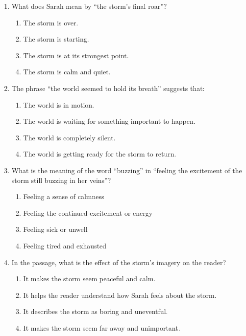 \documentclass[12pt]{article}
\begin{document}
\begin{enumerate}
\vspace{0.5cm}

\item What does Sarah mean by “the storm’s final roar”?

\begin{enumerate}[label=\Alph*.]
    \item The storm is over.
    \item The storm is starting.
    \item The storm is at its strongest point.
    \item The storm is calm and quiet.
\end{enumerate}

\vspace{0.5cm}

\item The phrase “the world seemed to hold its breath” suggests that:

\begin{enumerate}[label=\Alph*.]
    \item The world is in motion.
    \item The world is waiting for something important to happen.
    \item The world is completely silent.
    \item The world is getting ready for the storm to return.
\end{enumerate}

\vspace{0.5cm}

\item What is the meaning of the word “buzzing” in “feeling the excitement of the storm still buzzing in her veins”?

\begin{enumerate}[label=\Alph*.]
    \item Feeling a sense of calmness
    \item Feeling the continued excitement or energy
    \item Feeling sick or unwell
    \item Feeling tired and exhausted
\end{enumerate}

\vspace{0.5cm}

\item In the passage, what is the effect of the storm’s imagery on the reader?

\begin{enumerate}[label=\Alph*.]
    \item It makes the storm seem peaceful and calm.
    \item It helps the reader understand how Sarah feels about the storm.
    \item It describes the storm as boring and uneventful.
    \item It makes the storm seem far away and unimportant.
\end{enumerate}


\end{enumerate}
\end{document}
